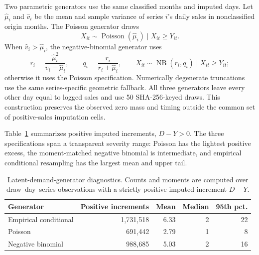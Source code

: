 \documentclass[msom,dblanonrev]{informs4}
\begin{document}
Two parametric generators use the same classified months and imputed days.
Let $\widehat\mu_i$ and $\widehat v_i$ be the mean and sample variance of series $i$'s daily sales in nonclassified origin months.
The Poisson generator draws
\[
X_{it}\sim \operatorname{Poisson}(\widehat\mu_i)\mid X_{it}\geq Y_{it}.
\]
When $\widehat v_i>\widehat\mu_i$, the negative-binomial generator uses
\[
r_i=\frac{\widehat\mu_i^2}{\widehat v_i-\widehat\mu_i},
\qquad
q_i=\frac{r_i}{r_i+\widehat\mu_i},
\qquad
X_{it}\sim \operatorname{NB}(r_i,q_i)\mid X_{it}\geq Y_{it};
\]
otherwise it uses the Poisson specification.
Numerically degenerate truncations use the same series-specific geometric fallback.
All three generators leave every other day equal to logged sales and use 50 SHA-256-keyed draws.
This construction preserves the observed zero mass and timing outside the common set of positive-sales imputation cells.

Table~\ref{tab:oa_dgp_diag} summarizes positive imputed increments, $D-Y>0$.
The three specifications span a transparent severity range: Poisson has the lightest positive excess, the moment-matched negative binomial is intermediate, and empirical conditional resampling has the largest mean and upper tail.

\begin{table}[htbp]
\caption{Latent-demand-generator diagnostics. Counts and moments are computed over draw--day--series observations with a strictly positive imputed increment $D-Y$.}\label{tab:oa_dgp_diag}
\centering\small
\begin{tabular}{lrrrr}
\toprule
\textbf{Generator} & \textbf{Positive increments} & \textbf{Mean} & \textbf{Median} & \textbf{95th pct.} \\
\midrule
Empirical conditional & 1{,}731{,}518 & 6.33 & 2 & 22 \\
Poisson               &   691{,}442 & 2.79 & 1 & 8 \\
Negative binomial     &   988{,}685 & 5.03 & 2 & 16 \\
\bottomrule
\end{tabular}
\end{table}
\end{document}
